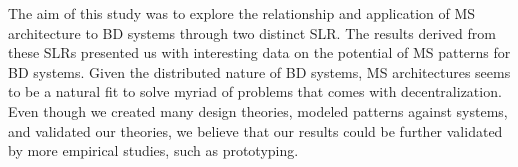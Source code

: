 \documentclass[a4paper,11pt,article,oneside]{memoir}
\begin{document}
The aim of this study was to explore the relationship and application of MS architecture to BD systems through two distinct SLR. The results derived from these SLRs presented us with interesting data on the potential of MS patterns for BD systems. Given the distributed nature of BD systems, MS architectures seems to be a natural fit to solve myriad of problems that comes with decentralization. Even though we created many design theories, modeled patterns against systems, and validated our theories, we believe that our results could be further validated by more empirical studies, such as prototyping.





\printbibliography
\end{document}
